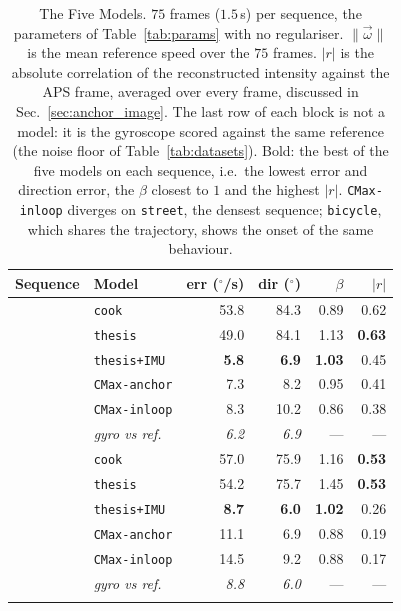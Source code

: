 \documentclass[journal]{IEEEtran}
\newcommand{\wvec}{\vec{\omega}}
\begin{document}
\begin{table}[!t]
\renewcommand{\arraystretch}{1.15}
\caption{The Five Models. \textnormal{$75$ frames ($1.5$\,s) per sequence, the
parameters of Table~\ref{tab:params} with no regulariser. $\|\wvec\|$ is the
mean reference speed over the $75$ frames. $|r|$ is the absolute correlation of the
reconstructed intensity against the APS frame, averaged over every frame, discussed in Sec.~\ref{sec:anchor_image}. The last row of each block is not a
model: it is the gyroscope scored against the same reference (the noise floor
of Table~\ref{tab:datasets}). Bold: the best of the five models on each sequence, i.e.\ the lowest
error and direction error, the $\beta$ closest to $1$ and the highest $|r|$. \texttt{CMax-inloop} diverges on \texttt{street}, the
densest sequence; \texttt{bicycle}, which shares the trajectory, shows the
onset of the same behaviour.}}
\label{tab:main}
\centering
\footnotesize
\begin{tabular}{@{}llrrrr@{}}
\toprule
Sequence & Model & err ($^\circ$/s) & dir ($^\circ$) & $\beta$ & $|r|$ \\
\midrule
{}
  & \texttt{cook} & 53.8 & 84.3 & 0.89 & 0.62 \\
  & \texttt{thesis} & 49.0 & 84.1 & 1.13 & \textbf{0.63} \\
  & \texttt{thesis+IMU} & \textbf{5.8} & \textbf{6.9} & \textbf{1.03} & 0.45 \\
  & \texttt{CMax-anchor} & 7.3 & 8.2 & 0.95 & 0.41 \\
  & \texttt{CMax-inloop} & 8.3 & 10.2 & 0.86 & 0.38 \\
 & \emph{gyro vs ref.}   & \emph{6.2} & \emph{6.9} & --- & --- \\
\midrule
{}
  & \texttt{cook} & 57.0 & 75.9 & 1.16 & \textbf{0.53} \\
  & \texttt{thesis} & 54.2 & 75.7 & 1.45 & \textbf{0.53} \\
  & \texttt{thesis+IMU} & \textbf{8.7} & \textbf{6.0} & \textbf{1.02} & 0.26 \\
  & \texttt{CMax-anchor} & 11.1 & 6.9 & 0.88 & 0.19 \\
  & \texttt{CMax-inloop} & 14.5 & 9.2 & 0.88 & 0.17 \\
 & \emph{gyro vs ref.}   & \emph{8.8} & \emph{6.0} & --- & --- \\
\midrule
{}

\end{tabular}
\end{table}
\end{document}
